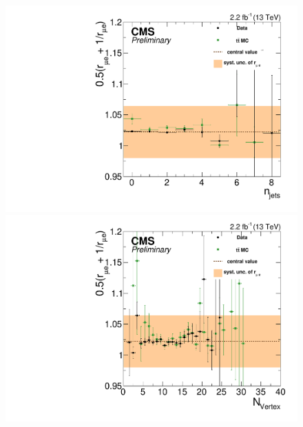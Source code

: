 \begin{figure}[htbp]
  \centering
  \begin{minipage}[t]{0.3\textwidth}
    \includegraphics[width=\textwidth]{bkgd/figs/rSFOFFromRMuE_ZPeakControlForward_Run2015_25ns_NJets_None.pdf}
  \end{minipage}
  \begin{minipage}[t]{0.3\textwidth}
    \includegraphics[width=\textwidth]{bkgd/figs/rSFOFFromRMuE_ZPeakControlForward_Run2015_25ns_nVtx_None.pdf}
  \end{minipage}
  \begin{minipage}[t]{0.3\textwidth}

\end{minipage}
\end{figure}
